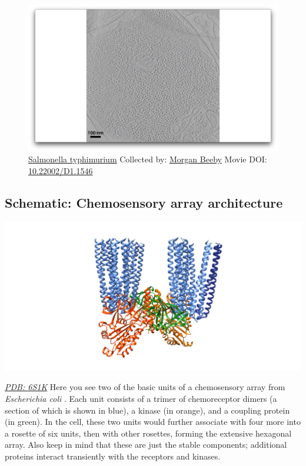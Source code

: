 \documentclass[]{tufte-book}
\begin{document}
\begin{figure}
\includegraphics{movie_stills/7_2} \caption[\protect\hyperlink{tree}{Salmonella typhimurium} Collected by:
\protect\hyperlink{morgan_beeby}{Morgan Beeby} Movie DOI:
\href{https://doi.org/10.22002/D1.1546}{10.22002/D1.1546}]{\protect\hyperlink{tree}{Salmonella typhimurium} Collected by:
\protect\hyperlink{morgan_beeby}{Morgan Beeby} Movie DOI:
\href{https://doi.org/10.22002/D1.1546}{10.22002/D1.1546}}\label{fig:7-2}
\end{figure}

\hypertarget{Chemosensory_array_architecture}{\subsection*{Schematic:
Chemosensory array architecture}\label{Chemosensory_array_architecture}}

\includegraphics{img/schematics/7_2_1}

\href{http://rcsb.org/structure/6S1K}{\emph{PDB: 6S1K}} Here you see two
of the basic units of a chemosensory array from \emph{Escherichia coli}
\citep{cassidy2020}. Each unit consists of a trimer of chemoreceptor
dimers (a section of which is shown in blue), a kinase (in orange), and
a coupling protein (in green). In the cell, these two units would
further associate with four more into a rosette of six units, then with
other rosettes, forming the extensive hexagonal array. Also keep in mind
that these are just the stable components; additional proteins interact
transiently with the receptors and kinases.
\end{document}
